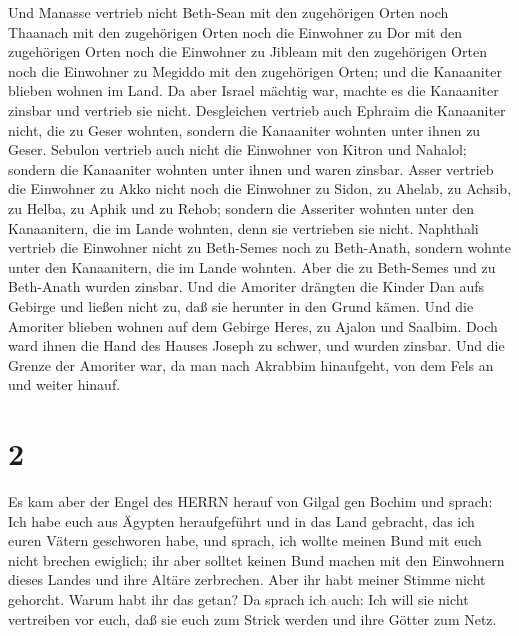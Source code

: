  Und Manasse vertrieb nicht Beth-Sean mit den zugehörigen
Orten noch Thaanach mit den zugehörigen Orten noch die Einwohner zu Dor
mit den zugehörigen Orten noch die Einwohner zu Jibleam mit den
zugehörigen Orten noch die Einwohner zu Megiddo mit den zugehörigen
Orten; und die Kanaaniter blieben wohnen im Land.  Da aber
Israel mächtig war, machte es die Kanaaniter zinsbar und vertrieb sie
nicht.  Desgleichen vertrieb auch Ephraim die Kanaaniter
nicht, die zu Geser wohnten, sondern die Kanaaniter wohnten unter ihnen
zu Geser.  Sebulon vertrieb auch nicht die Einwohner von
Kitron und Nahalol; sondern die Kanaaniter wohnten unter ihnen und waren
zinsbar.  Asser vertrieb die Einwohner zu Akko nicht noch
die Einwohner zu Sidon, zu Ahelab, zu Achsib, zu Helba, zu Aphik und zu
Rehob;  sondern die Asseriter wohnten unter den
Kanaanitern, die im Lande wohnten, denn sie vertrieben sie nicht.
 Naphthali vertrieb die Einwohner nicht zu Beth-Semes noch
zu Beth-Anath, sondern wohnte unter den Kanaanitern, die im Lande
wohnten. Aber die zu Beth-Semes und zu Beth-Anath wurden zinsbar.
 Und die Amoriter drängten die Kinder Dan aufs Gebirge und
ließen nicht zu, daß sie herunter in den Grund kämen.  Und
die Amoriter blieben wohnen auf dem Gebirge Heres, zu Ajalon und
Saalbim. Doch ward ihnen die Hand des Hauses Joseph zu schwer, und
wurden zinsbar.  Und die Grenze der Amoriter war, da man
nach Akrabbim hinaufgeht, von dem Fels an und weiter hinauf.

\hypertarget{section-1}{%
\section{2}\label{section-1}}

 Es kam aber der Engel des HERRN herauf von Gilgal gen
Bochim und sprach: Ich habe euch aus Ägypten heraufgeführt und in das
Land gebracht, das ich euren Vätern geschworen habe, und sprach, ich
wollte meinen Bund mit euch nicht brechen ewiglich;  ihr
aber solltet keinen Bund machen mit den Einwohnern dieses Landes und
ihre Altäre zerbrechen. Aber ihr habt meiner Stimme nicht gehorcht.
Warum habt ihr das getan?  Da sprach ich auch: Ich will sie
nicht vertreiben vor euch, daß sie euch zum Strick werden und ihre
Götter zum Netz.

